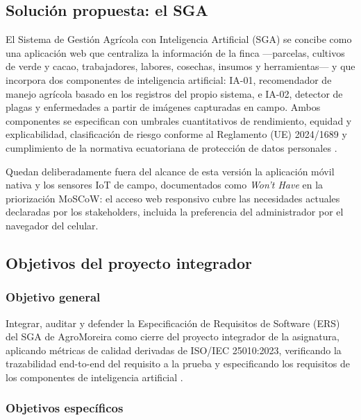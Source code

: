 \subsection{Soluci\'on propuesta: el SGA}

El Sistema de Gesti\'on Agr\'icola con Inteligencia Artificial (SGA) se concibe como una aplicaci\'on web que centraliza la informaci\'on de la finca ---parcelas, cultivos de verde y cacao, trabajadores, labores, cosechas, insumos y herramientas--- y que incorpora dos componentes de inteligencia artificial: IA-01, recomendador de manejo agr\'icola basado en los registros del propio sistema, e IA-02, detector de plagas y enfermedades a partir de im\'agenes capturadas en campo. Ambos componentes se especifican con umbrales cuantitativos de rendimiento, equidad y explicabilidad, clasificaci\'on de riesgo conforme al Reglamento (UE) 2024/1689 y cumplimiento de la normativa ecuatoriana de protecci\'on de datos personales \cite{eu20241689,lopdp2021}.

Quedan deliberadamente fuera del alcance de esta versi\'on la aplicaci\'on m\'ovil nativa y los sensores IoT de campo, documentados como \emph{Won't Have} en la priorizaci\'on MoSCoW: el acceso web responsivo cubre las necesidades actuales declaradas por los stakeholders, incluida la preferencia del administrador por el navegador del celular.

\subsection{Objetivos del proyecto integrador}

\subsubsection*{Objetivo general}

Integrar, auditar y defender la Especificaci\'on de Requisitos de Software (ERS) del SGA de AgroMoreira como cierre del proyecto integrador de la asignatura, aplicando m\'etricas de calidad derivadas de ISO/IEC 25010:2023, verificando la trazabilidad end-to-end del requisito a la prueba y especificando los requisitos de los componentes de inteligencia artificial \cite{iso25010}.

\subsubsection*{Objetivos espec\'ificos}

